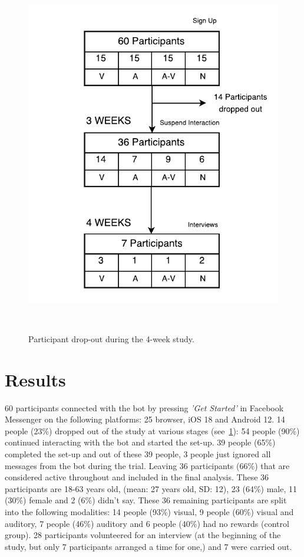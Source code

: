 \documentclass{scaffold/sigchi}
\begin{document}
\begin{figure}
  \centering
  \includegraphics[width=.8\columnwidth]{figures/study-flow}
  \caption{Participant drop-out during the 4-week study.}~\label{fig:study_dropout}
\end{figure}
 
\section{Results}
60 participants connected with the bot by pressing \textit{'Get Started'} in Facebook Messenger on the following platforms: 25 browser, iOS 18 and Android 12. 14 people (23\%) dropped out of the study at various stages (see~\ref{fig:study_dropout}): 54 people (90\%) continued interacting with the bot and started the set-up. 39 people (65\%) completed the set-up and out of these 39 people, 3 people just ignored all messages from the bot during the trial. Leaving 36 participants (66\%) that are considered active throughout and included in the final analysis. These 36 participants are 18-63 years old, (mean: 27 years old, SD: 12), 23 (64\%) male, 11 (30\%) female and 2 (6\%) didn't say. These 36 remaining participants are split into the following modalities: 14 people (93\%) visual, 9 people (60\%) visual and auditory, 7 people (46\%) auditory and 6 people (40\%) had no rewards (control group). 28 participants volunteered for an interview (at the beginning of the study, but only 7 participants arranged a time for one,) and 7 were carried out.
\end{document}
